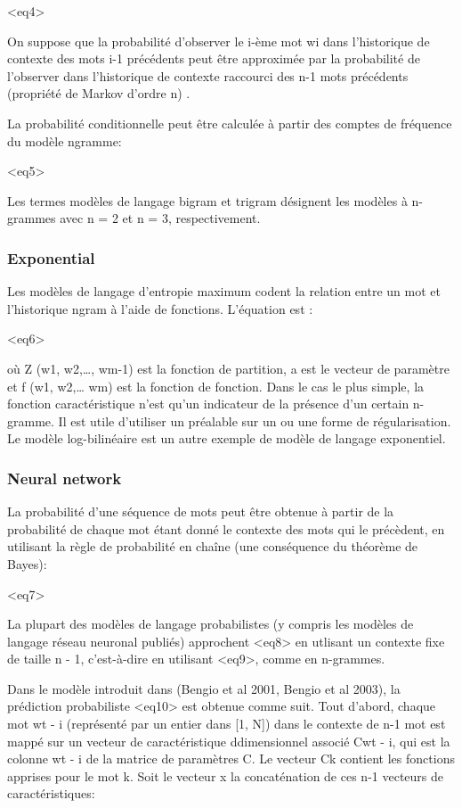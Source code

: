 \documentclass[a4paper, 12pt]{book}
\begin{document}
<eq4>

On suppose que la probabilité d'observer le i-ème mot wi dans l'historique de contexte des mots i-1 précédents peut être approximée par la probabilité de l'observer dans l'historique de contexte raccourci des n-1 mots précédents (propriété de Markov d'ordre n) .

La probabilité conditionnelle peut être calculée à partir des comptes de fréquence du modèle ngramme:

<eq5>

Les termes modèles de langage bigram et trigram désignent les modèles à n-grammes avec n = 2 et n = 3, respectivement.

\subsubsection{Exponential}

Les modèles de langage d'entropie maximum codent la relation entre un mot et l'historique ngram à l'aide de fonctions. L'équation est :

<eq6>

où Z (w1, w2,…, wm-1) est la fonction de partition, a est le vecteur de paramètre et f (w1, w2,… wm) est la fonction de fonction. Dans le cas le plus simple, la fonction caractéristique n'est qu'un indicateur de la présence d'un certain n-gramme. Il est utile d’utiliser un préalable sur un ou une forme de régularisation. Le modèle log-bilinéaire est un autre exemple de modèle de langage exponentiel.

\subsubsection{Neural network}

La probabilité d'une séquence de mots peut être obtenue à partir de la probabilité de chaque mot étant donné le contexte des mots qui le précèdent, en utilisant la règle de probabilité en chaîne (une conséquence du théorème de Bayes):

<eq7>

La plupart des modèles de langage probabilistes (y compris les modèles de langage réseau neuronal publiés) approchent <eq8> en utlisant un contexte fixe de taille n - 1, c'est-à-dire en utilisant <eq9>, comme en n-grammes.

Dans le modèle introduit dans (Bengio et al 2001, Bengio et al 2003), la prédiction probabiliste <eq10> est obtenue comme suit. Tout d'abord, chaque mot wt - i (représenté par un entier dans [1, N]) dans le contexte de n-1 mot est mappé sur un vecteur de caractéristique ddimensionnel associé Cwt - i, qui est la colonne wt - i de la matrice de paramètres C. Le vecteur Ck contient les fonctions apprises pour le mot k. Soit le vecteur x la concaténation de ces n-1 vecteurs de caractéristiques:
\end{document}
